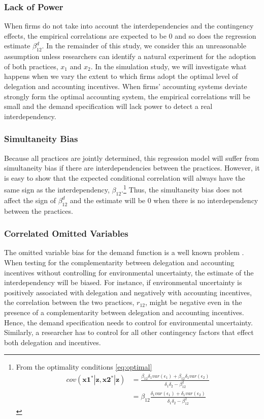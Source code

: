 \documentclass[12pt]{article}
\begin{document}
\subsubsection{Lack of Power}

When firms do not take into account the interdependencies and the contingency effects, the empirical correlations are expected to be 0 and so does the regression estimate $\beta_{12}^d$. In the remainder of this study, we consider this an unreasonable assumption unless researchers can identify a natural experiment for the adoption of both practices, $x_1$ and $x_2$. In the simulation study, we will investigate what happens when we vary the extent to which firms adopt the optimal level of delegation and accounting incentives. When firms' accounting systems deviate strongly form the optimal accounting system, the empirical correlations will be small and the demand specification will lack power to detect a real interdependency.

\subsubsection{Simultaneity Bias}

Because all practices are jointly determined, this regression model will suffer from simultaneity bias \citep{chenhall_issue_2007} if there are interdependencies between the practices. However, it is easy to show that the expected conditional correlation will always have the same sign as the interdependency, $\beta_{12}$.\footnote{From the optimality conditions \eqref{eq:optimal}
\begin{align*}
cov(\mathbf{x1^*}|\mathbf{z}, \mathbf{x2^*}|\mathbf{z}) 
&= \frac{\beta_{12} \delta_1 var(\epsilon_1) + \beta_{12} \delta_1 var(\epsilon_2)}{\delta_1 \delta_2 - \beta_{12}^2} \\
&= \beta_{12} \frac{\delta_1 var(\epsilon_1) + \delta_1 var(\epsilon_2)}{\delta_1 \delta_2 - \beta_{12}^2}
\end{align*}}
Thus, the simultaneity bias does not affect the sign of $\beta^d_{12}$ and the estimate will be 0 when there is no interdependency between the practices. 

\subsubsection{Correlated Omitted Variables}

The omitted variable bias for the demand function is a well known problem \citep{arora_testing_1996,grabner_management_2013,hofmann_organizational_2017}. When testing for the complementarity between delegation and accounting incentives without controlling for environmental uncertainty, the estimate of the interdependency will be biased. For instance, if environmental uncertainty is positively associated with delegation and negatively with accounting incentives, the correlation between the two practices, $r_{12}$, might be negative even in the presence of a complementarity between delegation and accounting incentives. Hence, the demand specification needs to control for environmental uncertainty. Similarly, a researcher has to control for all other contingency factors that effect both delegation and incentives.
\end{document}
